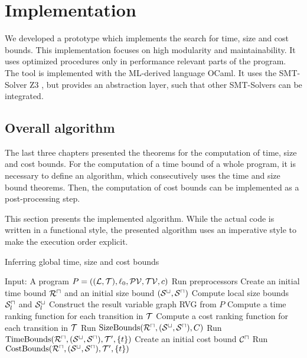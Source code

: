 \section{Implementation}

We developed a prototype which implements the search for time, size and cost bounds.
This implementation focuses on high modularity and maintainability.
It uses optimized procedures only in performance relevant parts of the program.
The tool is implemented with the ML-derived language OCaml.
It uses the SMT-Solver Z3 \cite{z3}, but provides an abstraction layer, such that other SMT-Solvers can be integrated.

\subsection{Overall algorithm}

The last three chapters presented the theorems for the computation of time, size and cost bounds.
For the computation of a time bound of a whole program, it is necessary to define an algorithm, which consecutively uses the time and size bound theorems.
Then, the computation of cost bounds can be implemented as a post-processing step.

This section presents the implemented algorithm.
While the actual code is written in a functional style, the presented algorithm uses an imperative style to make the execution order explicit.

\begin{algorithm}
\caption{Inferring global time, size and cost bounds}\label{complete_algorithm}
\begin{algorithmic}[1]
  \State Input: A program $P = ((\mathcal{L}, \mathcal{T}),\ell_0,\mathcal{PV},\mathcal{TV},c)$
  \State Run preprocessors
  \State Create an initial time bound ${\mathcal{R}^\sqcap}$ and an initial size bound ${({\mathcal{S}^\sqcup}, {\mathcal{S}^\sqcap})}$
  \State Compute local size bounds ${\mathcal{S}^\sqcap_l}$ and ${\mathcal{S}^\sqcup_l}$
  \State Construct the result variable graph RVG from $P$
  \State Compute a time ranking function for each transition in $\mathcal{T}$
  \State Compute a cost ranking function for each transition in $\mathcal{T}$
  \Repeat
      \State Run $\text{SizeBounds}({\mathcal{R}^\sqcap}, {({\mathcal{S}^\sqcup}, {\mathcal{S}^\sqcap})}, C)$
    \EndFor
        \State Run $\text{TimeBounds}({\mathcal{R}^\sqcap}, {({\mathcal{S}^\sqcup}, {\mathcal{S}^\sqcap})}, \mathcal{T}', \lbrace t \rbrace)$
      \EndFor
    \EndFor
  \State Create an initial cost bound ${\mathcal{C}^\sqcap}$
    \State Run $\text{CostBounds}({\mathcal{R}^\sqcap}, {({\mathcal{S}^\sqcup}, {\mathcal{S}^\sqcap})}, \mathcal{T}', \lbrace t \rbrace)$
  \EndFor
\end{algorithmic}
\end{algorithm}

